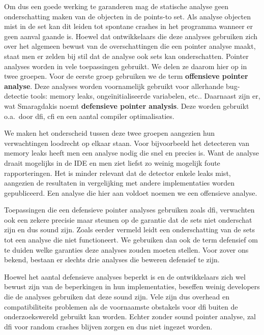 \documentclass[conference]{IEEEtran}
\begin{document}
Om dus een goede werking te garanderen mag de statische analyse geen onderschatting maken van de objecten in de points-to set. Als analyse objecten mist in de set kan 
dit leiden tot spontane crashes in het programma wanneer er geen aanval gaande is. Hoewel dat ontwikkelaars die deze analyses gebruiken zich over het algemeen bewust 
van de overschattingen die een pointer analyse maakt, staat men er zelden bij stil dat de analyse ook sets kan onderschatten.
Pointer analyses worden in vele toepassingen gebruikt. We delen ze daarom hier op in twee groepen. Voor de eerste groep gebruiken we de term \textbf{offensieve pointer analyse}.
Deze analyses worden voornamelijk gebruikt voor allerhande bug-detectie tools: memory leaks, ongeïnitialiseerde variabelen, 
etc.\cite{sui_svf_nodate}\cite{cherem_practical_nodate}\cite{ye_accelerating_nodate}. Daarnaast zijn er, wat Smaragdakis\cite{smaragdakis_defensive_2018} noemt 
\textbf{defensieve pointer analysis}. Deze worden gebruikt o.a.\ door \gls{dfi}\cite{castro_securing_nodate}\cite{diez-franco_optimized_2024}, 
\gls{cfi}\cite{kasten_integrating_2024}\cite{li_finding_2020} en een aantal compiler optimalisaties\cite{hind_interprocedural_1999}. 

We maken het onderscheid tussen deze twee groepen aangezien hun verwachtingen loodrecht op elkaar staan. Voor bijvoorbeeld het detecteren van memory leaks heeft men 
een analyse nodig die snel en precies is\cite{cherem_practical_nodate}\cite{fan_smoke_2019}. Want de analyse draait mogelijks in de IDE en men ziet liefst zo weinig 
mogelijk foute rapporteringen. Het is minder relevant dat de detector enkele leaks mist, aangezien de resultaten in vergelijking met andere implementaties worden gepubliceerd.
Een analyse die hier aan voldoet noemen we een offensieve analyse.

Toepassingen die een defensieve pointer analyses gebruiken zoals \gls{dfi}, verwachten ook een zekere precisie maar steunen op de garantie dat de sets niet onderschat zijn en dus 
sound zijn. Zoals eerder vermeld leidt een onderschatting van de sets tot een analyse die niet functioneert. We gebruiken dan ook de term defensief om te duiden welke garanties deze 
analyses zouden moeten stellen. Voor zover ons bekend, bestaan er slechts drie analyses die beweren defensief te zijn.\cite{smaragdakis_defensive_2018}\cite{cai_unleashing_nodate}\cite{lu_practical_2023}

Hoewel het aantal defensieve analyses beperkt is en de ontwikkelaars zich wel bewust zijn van de beperkingen in hun implementaties\cite{vojnar_phasar_2019}, beseffen weinig 
developers die de analyses gebruiken dat deze sound zijn. Vele zijn dus overhead en compatibiliteits problemen als de voornaamste obstakels\cite{mathiasen_fine-grained_2021}\cite{bellec_rt-dfi_2022}\cite{diez-franco_optimized_2024}\cite{feng_toward_2022} 
voor \gls{dfi} buiten de onderzoekswereld gebruikt kan worden. Echter zonder sound pointer analyse, zal \gls{dfi} voor random crashes blijven zorgen en dus niet ingezet worden.
\end{document}
